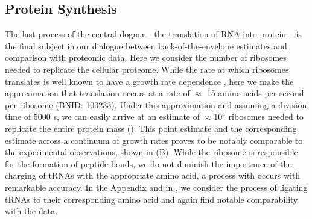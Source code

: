 \subsection{Protein Synthesis}
The last process of the central dogma -- the translation of RNA into protein
-- is the final subject in our dialogue between back-of-the-envelope
estimates and comparison with proteomic data. Here we consider the number of
ribosomes needed to replicate the cellular proteome. While the rate at which
ribosomes translates is well known to have a growth rate dependence
\cite{dai2018}, here we make the approximation that translation occurs at a
rate of $\approx$ 15 amino acids per second per ribosome (BNID: 100233).
Under this approximation and assuming a division time of 5000 s, we can
easily arrive at an estimate of $\approx 10^4$ ribosomes needed to replicate
the entire protein mass (). This point estimate and
the corresponding estimate across a continuum of growth rates proves to be
notably comparable to the experimental observations, shown in
(B). While the ribosome is responsible for the
formation of peptide bonds, we do not diminish the importance of the charging
of tRNAs with the appropriate amino acid, a process with occurs with
remarkable accuracy. In the Appendix and in
, we consider the process of ligating tRNAs
to their corresponding amino acid and again find notable comparability with
the data.




